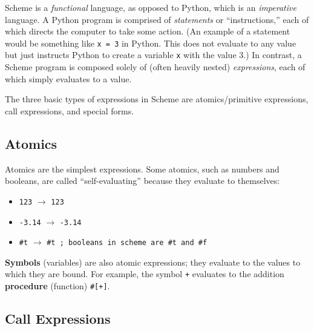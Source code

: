 Scheme is a \textit{functional} language, as opposed to Python, which is an \textit{imperative} language. A Python program is comprised of \textit{statements} or ``instructions,'' each of which directs the computer to take some action. (An example of a statement would be something like \lstinline{x = 3} in Python. This does not evaluate to any value but just instructs Python to create a variable \lstinline{x} with the value 3.) In contrast, a Scheme program is composed solely of (often heavily nested) \textit{expressions}, each of which simply evaluates to a value. 

The three basic types of expressions in Scheme are atomics/primitive expressions, call expressions, and special forms.  

\subsection{Atomics}

Atomics are the simplest expressions. Some atomics, such as numbers and booleans, are called ``self-evaluating'' because they evaluate to themselves: 
\begin{itemize}
    \item \lstinline{123} $\rightarrow$ \lstinline{123}
    \item \lstinline{-3.14} $\rightarrow$ \lstinline{-3.14}
    \item \lstinline{#t} $\rightarrow$ \lstinline{#t ; booleans in scheme are #t and #f}
\end{itemize}

\textbf{Symbols} (variables) are also atomic expressions; they evaluate to the values to which they are bound. For example, the symbol \lstinline{+} evaluates to the addition \textbf{procedure} (function) \lstinline{#[+]}. 

\subsection{Call Expressions}

